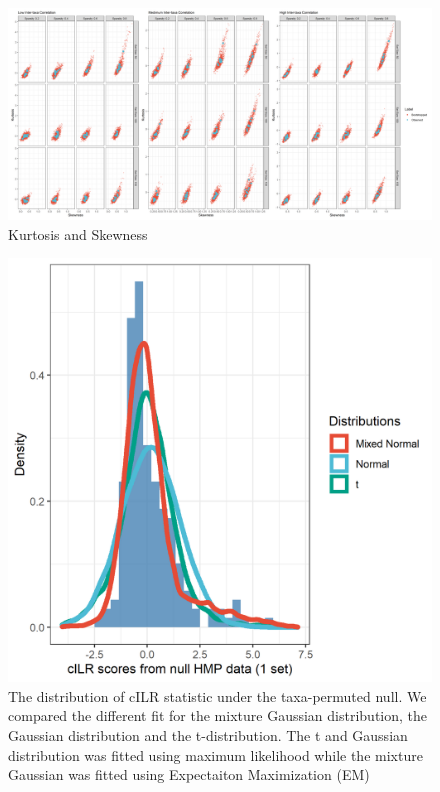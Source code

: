 \documentclass{article}
\begin{document}
\begin{figure}[h]
    \centering
    \includegraphics[width=\linewidth]{figures/kurtosis_skewness_sim.png}
    \caption{Kurtosis and Skewness}
\end{figure}

\begin{figure}[h]
    \centering
    \includegraphics[scale=0.6]{figures/distr_density_plot_real.png}
    \caption{The distribution of cILR statistic under the taxa-permuted null. We compared the different fit for the mixture Gaussian distribution, the Gaussian distribution and the t-distribution. The t and Gaussian distribution was fitted using maximum likelihood while the mixture Gaussian was fitted using Expectaiton Maximization (EM)}
\end{figure}

\newpage
{}

\end{document}
